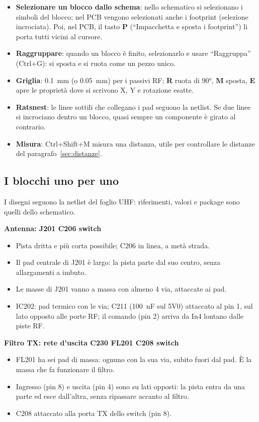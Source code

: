 \documentclass[a4paper,11pt]{article}
\newcommand{\blocco}[3]{%
  \par\medskip\noindent\begin{minipage}{\linewidth}
  {\sffamily\bfseries\color{sbblue}#1}\par\smallskip
  \centering\par\smallskip
  \raggedright\small #3
  \end{minipage}\par\medskip}
\begin{document}
\begin{nota}
\begin{itemize}[nosep]
\item \textbf{Selezionare un blocco dallo schema}: nello schematico si selezionano i simboli del blocco; nel PCB vengono selezionati anche i footprint (selezione incrociata). Poi, nel PCB, il tasto \textbf{P} (\enquote{Impacchetta e sposta i footprint}) li porta tutti vicini al cursore.
\item \textbf{Raggruppare}: quando un blocco è finito, selezionarlo e usare \enquote{Raggruppa} (Ctrl+G): si sposta e si ruota come un pezzo unico.
\item \textbf{Griglia}: \SI{0.1}{mm} (o \SI{0.05}{mm}) per i passivi RF; \textbf{R} ruota di \ang{90}, \textbf{M} sposta, \textbf{E} apre le proprietà dove si scrivono X, Y e rotazione esatte.
\item \textbf{Ratsnest}: le linee sottili che collegano i pad seguono la netlist. Se due linee si incrociano dentro un blocco, quasi sempre un componente è girato al contrario.
\item \textbf{Misura}: Ctrl+Shift+M misura una distanza, utile per controllare le distanze del paragrafo~\ref{sec:distanze}.
\end{itemize}
\end{nota}

\subsection{I blocchi uno per uno}
I disegni seguono la netlist del foglio UHF: riferimenti, valori e package sono quelli dello schematico.

\blocco{Antenna: J201 \textrightarrow{} C206 \textrightarrow{} switch}{blk_antenna}{%
\begin{itemize}[nosep]
\item Pista dritta e più corta possibile; C206 in linea, a metà strada.
\item Il pad centrale di J201 è largo: la pista parte dal suo centro, senza allargamenti a imbuto.
\item Le masse di J201 vanno a massa con almeno 4 via, attaccate ai pad.
\item IC202: pad termico con le via; C211 (\SI{100}{nF} sul 5V0) attaccato al pin 1, sul lato opposto alle porte RF; il comando (pin 2) arriva da In4 lontano dalle piste RF.
\end{itemize}}

\blocco{Filtro TX: rete d'uscita \textrightarrow{} C230 \textrightarrow{} FL201 \textrightarrow{} C208 \textrightarrow{} switch}{blk_filtro_tx}{%
\begin{itemize}[nosep]
\item FL201 ha sei pad di massa: ognuno con la sua via, subito fuori dal pad. È la massa che fa funzionare il filtro.
\item Ingresso (pin 8) e uscita (pin 4) sono su lati opposti: la pista entra da una parte ed esce dall'altra, senza ripassare accanto al filtro.
\item C208 attaccato alla porta TX dello switch (pin 8).
\end{itemize}}
\end{document}
